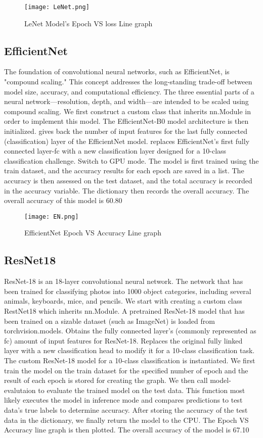 \documentclass[10pt,twocolumn,letterpaper]{article}
\begin{document}
\begin{figure}[h]
    \centering
    \texttt{[image: LeNet.png]}
    \caption{LeNet Model's Epoch VS loss Line graph}
    \label{fig:example_image}
\end{figure}


\subsection{EfficientNet}
The foundation of convolutional neural networks, such as EfficientNet, is "compound scaling." This concept addresses the long-standing trade-off between model size, accuracy, and computational efficiency. The three essential parts of a neural network—resolution, depth, and width—are intended to be scaled using compound scaling. We first construct a custom class that inherits nn.Module in order to implement this model. The EfficientNet-B0 model architecture is then initialized. gives back the number of input features for the last fully connected (classification) layer of the EfficientNet model. replaces EfficientNet's first fully connected layer-fc with a new classification layer designed for a 10-class classification challenge. Switch to GPU mode. The model is first trained using the train dataset, and the accuracy results for each epoch are saved in a list. The accuracy is then assessed on the test dataset, and the total accuracy is recorded in the accuracy variable. The dictionary then records the overall accuracy.  The overall accuracy of this model is 60.80%

\begin{figure}[h]
    \centering
    \texttt{[image: EN.png]}
    \caption{EfficientNet Epoch VS Accuracy Line graph}
    \label{fig:example_image}
\end{figure}
\text{}


\subsection{ResNet18}
ResNet-18 is an 18-layer convolutional neural network. The network that has been trained for classifying photos into 1000 object categories, including several animals, keyboards, mice, and pencils. We start with creating a custom class RestNet18 which inherits nn.Module. A pretrained ResNet-18 model that has been trained on a sizable dataset (such as ImageNet) is loaded from torchvision.models. Obtains the fully connected layer's (commonly represented as fc) amount of input features for ResNet-18. Replaces the original fully linked layer with a new classification head to modify it for a 10-class classification task. The custom ResNet-18 model for a 10-class classification  is instantiated. We first train the model on the train dataset for the specified number of epoch and the result of each epoch is stored for creating the graph. We then call model-evalutaion to evaluate the trained model on the test data. This function most likely executes the model in inference mode and compares predictions to test data’s true labels to determine accuracy. After storing the accuracy of the test data in the dictionary, we finally return the model to the CPU. The Epoch VS Accuracy line graph is then plotted. The overall accuracy of the model is 67.10%
\end{document}
